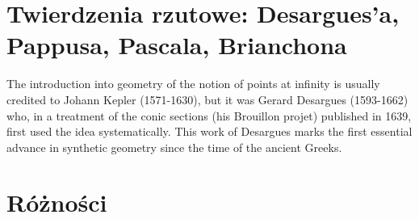 \section{Twierdzenia rzutowe: Desargues'a, Pappusa, Pascala, Brianchona}




The introduction into geometry of the notion of points at infinity is usually credited to Johann Kepler (1571-1630), but it was Gerard
Desargues (1593-1662) who, in a treatment of the conic sections
(his Brouillon projet) published in 1639, first used the idea systematically. This work of Desargues marks the first essential advance in synthetic geometry since the time of the ancient Greeks.

\section{Różności}



%